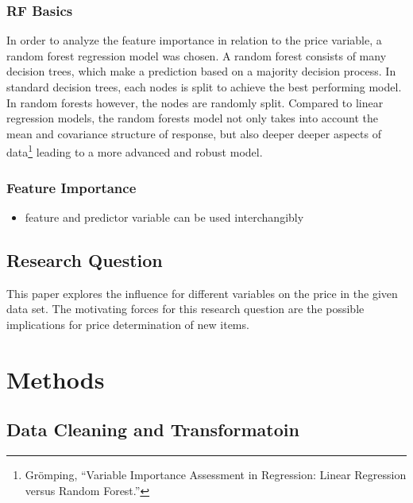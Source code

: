 \documentclass[a4paper, nobind]{templates/ociamthesis}
\providecommand{\tightlist}{%
  \setlength{\itemsep}{0pt}\setlength{\parskip}{0pt}}
\begin{document}
\hypertarget{rf-basics}{%
\subsection{RF Basics}\label{rf-basics}}

In order to analyze the feature importance in relation to the price variable, a random forest regression model was chosen. A random forest consists of many decision trees, which make a prediction based on a majority decision process. In standard decision trees, each nodes is split to achieve the best performing model. In random forests however, the nodes are randomly split. Compared to linear regression models, the random forests model not only takes into account the mean and covariance structure of response, but also deeper deeper aspects of data\footnote{Grömping, ``Variable Importance Assessment in Regression: Linear Regression versus Random Forest.''} leading to a more advanced and robust model.

\hypertarget{feature-importance}{%
\subsection{Feature Importance}\label{feature-importance}}

\begin{itemize}
\tightlist
\item
  feature and predictor variable can be used interchangibly
\end{itemize}

\hypertarget{research_question}{%
\section{Research Question}\label{research_question}}

This paper explores the influence for different variables on the price in the given data set. The motivating forces for this research question are the possible implications for price determination of new items.

\hypertarget{methods}{%
\chapter{Methods}\label{methods}}

\hypertarget{datacleaning}{%
\section{Data Cleaning and Transformatoin}\label{datacleaning}}
\end{document}
